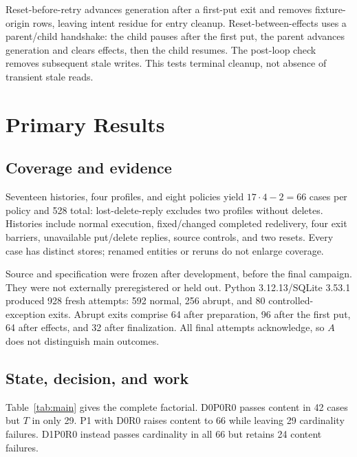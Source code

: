\documentclass[10pt,letterpaper]{article}
\begin{document}
Reset-before-retry advances generation after a first-put exit and removes fixture-origin rows, leaving intent residue for entry cleanup. Reset-between-effects uses a parent/child handshake: the child pauses after the first put, the parent advances generation and clears effects, then the child resumes. The post-loop check removes subsequent stale writes. This tests terminal cleanup, not absence of transient stale reads.

\section{Primary Results}
\label{sec:evaluation}
\subsection{Coverage and evidence}
Seventeen histories, four profiles, and eight policies yield $17\cdot4-2=66$ cases per policy and 528 total: lost-delete-reply excludes two profiles without deletes. Histories include normal execution, fixed/changed completed redelivery, four exit barriers, unavailable put/delete replies, source controls, and two resets. Every case has distinct stores; renamed entities or reruns do not enlarge coverage.

Source and specification were frozen after development, before the final campaign. They were not externally preregistered or held out. Python 3.12.13/SQLite 3.53.1 produced 928 fresh attempts: 592 normal, 256 abrupt, and 80 controlled-exception exits. Abrupt exits comprise 64 after preparation, 96 after the first put, 64 after effects, and 32 after finalization. All final attempts acknowledge, so $A$ does not distinguish main outcomes.

\subsection{State, decision, and work}
Table~\ref{tab:main} gives the complete factorial. D0P0R0 passes content in 42 cases but $T$ in only 29. P1 with D0R0 raises content to 66 while leaving 29 cardinality failures. D1P0R0 instead passes cardinality in all 66 but retains 24 content failures.
\end{document}
